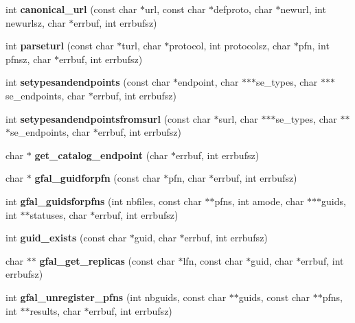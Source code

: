 \begin{CompactItemize}
\item 
int \textbf{canonical\_\-url} (const char $\ast$url, const char $\ast$defproto, char $\ast$newurl, int newurlsz, char $\ast$errbuf, int errbufsz)\label{gfal__common_8c_951b857d6ce43fd8a8914844b5de559a}

\item 
int \textbf{parseturl} (const char $\ast$turl, char $\ast$protocol, int protocolsz, char $\ast$pfn, int pfnsz, char $\ast$errbuf, int errbufsz)\label{gfal__common_8c_1592fb1bdd6aa5ab4c56e3aaf9240b98}

\item 
int \textbf{setypesandendpoints} (const char $\ast$endpoint, char $\ast$$\ast$$\ast$se\_\-types, char $\ast$$\ast$$\ast$se\_\-endpoints, char $\ast$errbuf, int errbufsz)\label{gfal__common_8c_42f0dde4abdd73f485da45932283f669}

\item 
int \textbf{setypesandendpointsfromsurl} (const char $\ast$surl, char $\ast$$\ast$$\ast$se\_\-types, char $\ast$$\ast$$\ast$se\_\-endpoints, char $\ast$errbuf, int errbufsz)\label{gfal__common_8c_563ab483cd3ebb8e7d365d7803523ff5}

\item 
char $\ast$ \textbf{get\_\-catalog\_\-endpoint} (char $\ast$errbuf, int errbufsz)\label{gfal__common_8c_43eaae6782e74a6d25cd0a0f8183833e}

\item 
char $\ast$ \textbf{gfal\_\-guidforpfn} (const char $\ast$pfn, char $\ast$errbuf, int errbufsz)\label{group__internal__group_g86568afb8c7f9b0d6944de793a3e867a}

\item 
int \textbf{gfal\_\-guidsforpfns} (int nbfiles, const char $\ast$$\ast$pfns, int amode, char $\ast$$\ast$$\ast$guids, int $\ast$$\ast$statuses, char $\ast$errbuf, int errbufsz)\label{group__internal__group_g72f2d9fb6a55816f243a4c57c5369fe5}

\item 
int \textbf{guid\_\-exists} (const char $\ast$guid, char $\ast$errbuf, int errbufsz)\label{gfal__common_8c_a880588c2bf383146384431128d4cf88}

\item 
char $\ast$$\ast$ \textbf{gfal\_\-get\_\-replicas} (const char $\ast$lfn, const char $\ast$guid, char $\ast$errbuf, int errbufsz)\label{group__internal__group_gbd0a581309f65e07a5e28d442f07b169}

\item 
int \textbf{gfal\_\-unregister\_\-pfns} (int nbguids, const char $\ast$$\ast$guids, const char $\ast$$\ast$pfns, int $\ast$$\ast$results, char $\ast$errbuf, int errbufsz)\label{group__internal__group_g70f889fa2436723fb7b3cff20b661f21}


\end{CompactItemize}
